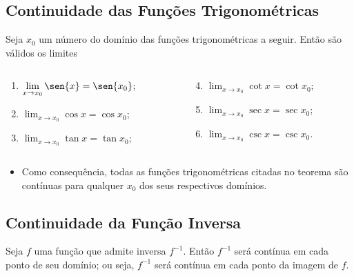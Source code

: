 \subsection{Continuidade das Funções Trigonométricas}
\begin{frame}
  \begin{theorem}
    Seja $x_{0}$ um número do domínio das funções trigonométricas a seguir. Então são válidos os limites
    \begin{columns}[onlytextwidth]
      \begin{column}{0.5\textwidth}
        \begin{enumerate}
          \item $\displaystyle\lim_{x\to x_{0}}{\sen{x}} = \sen{x_{0}}$;
          \item $\displaystyle\lim_{x\to x_{0}}{\cos{x}} = \cos{x_{0}}$;
          \item $\displaystyle\lim_{x\to x_{0}}{\tan{x}} = \tan{x_{0}}$;
        \end{enumerate}
      \end{column}
      \begin{column}{0.5\textwidth}
        \begin{enumerate}\setcounter{enumi}{3}
          \item $\displaystyle\lim_{x\to x_{0}}{\cot{x}} = \cot{x_{0}}$;
          \item $\displaystyle\lim_{x\to x_{0}}{\sec{x}} = \sec{x_{0}}$;
          \item $\displaystyle\lim_{x\to x_{0}}{\csc{x}} = \csc{x_{0}}$.
        \end{enumerate}
      \end{column}
    \end{columns}
  \end{theorem}
  \begin{itemize}
    \item Como consequência, todas as funções trigonométricas citadas no teorema são contínuas para qualquer $x_{0}$ dos seus respectivos domínios.
  \end{itemize}
\end{frame}

\subsection{Continuidade da Função Inversa}
\begin{frame}
  \begin{theorem}
    Seja $f$ uma função que admite inversa $f^{-1}$. Então $f^{-1}$ será contínua em cada ponto de seu domínio; ou seja, $f^{-1}$ será contínua em cada ponto da imagem de $f$.
  \end{theorem}
\end{frame}

